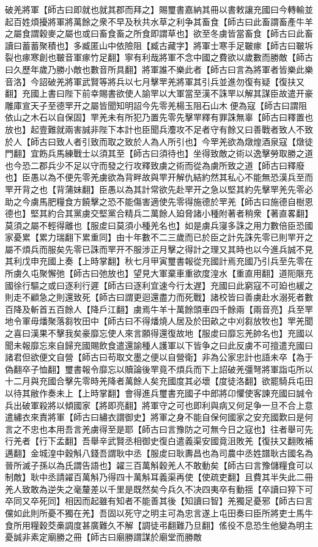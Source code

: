 破羌將軍【師古曰即就也就其郡而拜之】賜璽書嘉納其冊以書敕讓充國曰今轉輸並起百姓煩擾將軍將萬餘之衆不早及秋共水草之利争其畜食【師古曰此畜謂畜產牛羊之屬食謂穀麥之屬也或曰畜食畜之所食即謂草也】欲至冬虜皆當畜食【師古曰此畜讀曰蓄蓄聚積也】多臧匿山中依險阻【臧古藏字】將軍士寒手足皸瘃【師古曰皸坼裂也瘃寒創也皸音軍瘃竹足翻】寧有利哉將軍不念中國之費欲以歲數而勝敵【師古曰久歷年歲乃勝小敵也數音所具翻】將軍誰不樂此者【師古曰言為將軍者皆樂此樂音洛】今詔破羌將軍武賢等將兵以七月擊䍐羌將軍其引兵並進勿復有疑【復扶又翻】充國上書曰陛下前幸賜書欲使人諭䍐以大軍當至漢不誅䍐以解其謀臣故遣开豪雕庫宣天子至德䍐开之屬皆聞知明詔今先零羌楊玉阻石山木便為寇【師古曰謂阻依山之木石以自保固】䍐羌未有所犯乃置先零先擊䍐釋有罪誅無辜【師古曰釋置也放也】起壹難就兩害誠非陛下本計也臣聞兵灋攻不足者守有餘又曰善戰者致人不致於人【師古曰致人者引致而取之致於人為人所引也】今䍐羌欲為燉煌酒泉寇【燉徒門翻】宜飭兵馬練戰士以須其至【師古曰須待也】坐得致敵之術以逸擊勞取勝之道也今恐二郡兵少不足以守而發之行攻釋致虜之術而從為虜所致之道【師古曰釋廢也】臣愚以為不便先零羌虜欲為背畔故與䍐开解仇結約然其私心不能無恐漢兵至而䍐开背之也【背蒲妹翻】臣愚以為其計常欲先赴䍐开之急以堅其約先擊䍐羌先零必助之今虜馬肥糧食方饒擊之恐不能傷害適使先零得施德於䍐羌【師古曰施德自樹恩德也】堅其約合其黨虜交堅黨合精兵二萬餘人廹脅諸小種附著者稍衆【著直畧翻】莫須之屬不輕得離也【服䖍曰莫須小種羌名也】如是虜兵寖多誅之用力數倍臣恐國家憂累【累力瑞翻下累重同】由十年數不二三歲而已於臣之計先誅先零已則䍐开之屬不煩兵而服矣先零已誅而䍐开不服涉正月擊之得計之理又其時也以今進兵誠不見其利戊申充國上奏【上時掌翻】秋七月甲寅璽書報從充國計焉充國乃引兵至先零在所虜久屯聚懈弛【師古曰弛放也】望見大軍棄車重欲度湟水【重直用翻】道阨陿充國徐行驅之或曰逐利行遲【師古曰逐利宜速今行太遅】充國曰此窮寇不可廹也緩之則走不顧急之則還致死【師古曰謂更迴還盡力而死戰】諸校皆曰善虜赴水溺死者數百降及斬首五百餘人【降戶江翻】虜焉牛羊十萬餘頭車四千餘兩【兩音亮】兵至䍐地令軍毋燔聚落芻牧田中【師古曰不得燔燒人居及於田畝之中刈芻放牧也】䍐羌聞之喜曰漢果不擊我矣豪靡忘使人來言願得還復故地【服䖍曰靡忘羌帥名也】充國以聞未報靡忘來自歸充國賜飲食遣還諭種人護軍以下皆争之曰此反虜不可擅遣充國曰諸君但欲便文自營【師古曰苟取文墨之便以自營衛】非為公家忠計也語未卒【為于偽翻卒子恤翻】璽書報令靡忘以贖論後䍐竟不煩兵而下上詔破羌彊弩將軍詣屯所以十二月與充國合擊先零時羌降者萬餘人矣充國度其必壞【度徒洛翻】欲罷騎兵屯田以待其敝作奏未上【上時掌翻】會得進兵璽書充國子中郎將卬懼使客諫充國曰誠令兵出破軍殺將以傾國家【將即亮翻】將軍守之可也即利與病又何足争一旦不合上意遣繡衣來責將軍【師古曰繡衣謂御史】將軍之身不能自保何國家之安充國歎曰是何言之不忠也本用吾言羌虜得至是耶【師古曰言豫防之可無今日之寇也】往者舉可先行羌者【行下孟翻】吾舉辛武賢丞相御史復白遣義渠安國竟沮敗羌【復扶又翻敗補邁翻】金城湟中穀斛八錢吾謂耿中丞【服䖍曰耿夀昌也為司農中丞姓譜耿古國名為晉所滅子孫以為氏謂告語也】糴三百萬斛穀羌人不敢動矣【師古曰言豫儲糧食可以制敵】耿中丞請糴百萬斛乃得四十萬斛耳義渠再使【使疏吏翻】且費其半失此二冊羌人致敢為逆失之毫釐差以千里是既然矣今兵久不决四夷卒有動揺【卒讀曰猝下可卒同又卒死同】相因而起雖有知者不能善其後【知讀曰智】羌獨足憂邪【師古曰言儻如此則所憂不獨在羌】吾固以死守之明主可為忠言遂上屯田奏曰臣所將吏士馬牛食所用糧穀茭槀調度甚廣難久不解【調徒弔翻難乃旦翻】傜役不息恐生他變為明主憂誠非素定廟勝之冊【師古曰廟勝謂謀於廟堂而勝敵